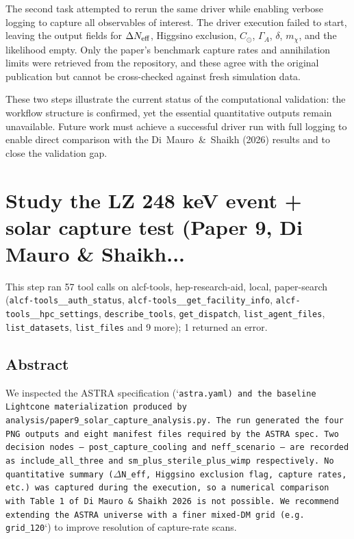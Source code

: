 \documentclass[11pt,a4paper]{article}
\begin{document}
The second task attempted to rerun the same driver while enabling verbose logging to capture all observables of interest. The driver execution failed to start, leaving the output fields for $\Delta N_{\rm eff}$, Higgsino exclusion, $C_{\odot}$, $\Gamma_{A}$, $\delta$, $m_{\chi}$, and the likelihood empty. Only the paper's benchmark capture rates and annihilation limits were retrieved from the repository, and these agree with the original publication but cannot be cross-checked against fresh simulation data.

These two steps illustrate the current status of the computational validation: the workflow structure is confirmed, yet the essential quantitative outputs remain unavailable. Future work must achieve a successful driver run with full logging to enable direct comparison with the Di~Mauro~\&~Shaikh (2026) results and to close the validation gap.

\section{Study the LZ 248 keV event + solar capture test (Paper 9, Di Mauro \& Shaikh...}
This step ran 57 tool calls on alcf-tools, hep-research-aid, local, paper-search (\texttt{alcf-tools\_\_auth\_status}, \texttt{alcf-tools\_\_get\_facility\_info}, \texttt{alcf-tools\_\_hpc\_settings}, \texttt{describe\_tools}, \texttt{get\_dispatch}, \texttt{list\_agent\_files}, \texttt{list\_datasets}, \texttt{list\_files} and 9 more); 1 returned an error.\par
\subsection{Abstract}
We inspected the ASTRA specification (`\texttt{astra.yaml}\texttt{)\allowbreak{} and the baseline Lightcone materialization produced by }\texttt{analysis/\allowbreak{}paper9\_\allowbreak{}solar\_\allowbreak{}capture\_\allowbreak{}analysis.py}\texttt{. The run generated the four PNG outputs and eight manifest files required by the ASTRA spec. Two decision nodes -- }\texttt{post\_\allowbreak{}capture\_\allowbreak{}cooling}\texttt{ and }\texttt{neff\_\allowbreak{}scenario}\texttt{ -- are recorded as }\texttt{include\_\allowbreak{}all\_\allowbreak{}three}\texttt{ and }\texttt{sm\_\allowbreak{}plus\_\allowbreak{}sterile\_\allowbreak{}plus\_\allowbreak{}wimp}\texttt{ respectively. No quantitative summary ($\Delta$N\_\allowbreak{}eff,\allowbreak{} Higgsino exclusion flag,\allowbreak{} capture rates,\allowbreak{} etc.)\allowbreak{} was captured during the execution,\allowbreak{} so a numerical comparison with Table~1 of Di~Mauro~\&~Shaikh~2026 is not possible. We recommend extending the ASTRA universe with a finer mixed-DM grid (e.g. }\texttt{grid\_\allowbreak{}120}`) to improve resolution of capture-rate scans.
\end{document}
